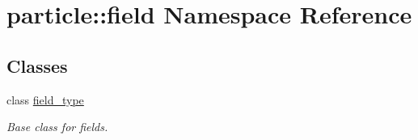\hypertarget{namespaceparticle_1_1field}{}\section{particle\+:\+:field Namespace Reference}
\label{namespaceparticle_1_1field}
\subsection*{Classes}
\begin{DoxyCompactItemize}
\item 
class \hyperlink{classparticle_1_1field_1_1field__type}{field\+\_\+type}
\begin{DoxyCompactList}\small\item\em Base class for fields. \end{DoxyCompactList}\end{DoxyCompactItemize}
